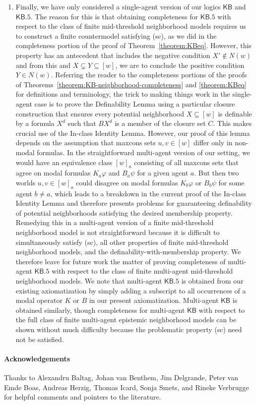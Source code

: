 \documentclass[12pt]{article}
\theoremstyle{definition}
\newcommand{\KB}{{\mathsf{KB}}}                 %
\newcommand{\KBeq}{{\mathsf{KB.5}}}             %
\begin{document}
\begin{enumerate}
\item Finally, we have only considered a single-agent version of our
  logics $\KB$ and $\KBeq$.  The reason for this is that obtaining
  completeness for $\KBeq$ with respect to the class of finite
  mid-threshold neighborhood models requires us to construct a finite
  countermodel satisfying (sc), as we did in the completeness portion
  of the proof of Theorem~\ref{theorem:KBeq}.  However, this property
  has an antecedent that includes the negative condition
  $X'\notin N(w)$ and from this and $X\subsetneq Y\subseteq[w]$, we
  are to conclude the positive condition $Y\in N(w)$.  Referring the
  reader to the completeness portions of the proofs of
  Theorems~\ref{theorem:KB-neighborhood-completeness} and
  \ref{theorem:KBeq} for definitions and terminology, the trick to
  making things work in the single-agent case is to prove the
  Definability Lemma using a particular closure construction that
  ensures every potential neighborhood $X\subseteq[w]$ is definable by
  a formula $X^d$ such that $BX^d$ is a member of the closure set $C$.
  This makes crucial use of the In-class Identity Lemma.  However, our
  proof of this lemma depends on the assumption that maxcons sets
  $u,v\in[w]$ differ only in non-modal formulas.  In the
  straightforward multi-agent version of our setting, we would have an
  equivalence class $[w]_a$ consisting of all maxcons sets that agree
  on modal formulas $K_a\varphi$ and $B_a\psi$ for a given agent $a$.
  But then two worlds $u,v\in[w]_a$ could disagree on modal formulas
  $K_b\varphi$ or $B_b\psi$ for some agent $b\neq a$, which leads to a
  breakdown in the current proof of the In-class Identity Lemma and
  therefore presents problems for guaranteeing definability of
  potential neighborhoods satisfying the desired membership property.
  Remedying this in a multi-agent version of a finite mid-threshold
  neighborhood model is not straightforward because it is difficult to
  simultaneously satisfy (sc), all other properties of finite
  mid-threshold neighborhood models, and the
  definability-with-membership property. We therefore leave for future
  work the matter of proving completeness of multi-agent $\KBeq$ with
  respect to the class of finite multi-agent mid-threshold
  neighborhood models.  We note that multi-agent $\KBeq$ is obtained
  from our existing axiomatization by simply adding a subscript to all
  occurrences of a modal operator $K$ or $B$ in our present
  axiomatization. Multi-agent $\KB$ is obtained similarly, though
  completeness for multi-agent $\KB$ with respect to the full class of
  finite multi-agent epistemic neighborhood models can be shown
  without much difficulty because the problematic property (sc) need
  not be satisfied.
\end{enumerate}

\paragraph{Acknowledgements} 

Thanks to Alexandru Baltag, Johan van Benthem, Jim Delgrande, Peter
van Emde Boas, Andreas Herzig, Thomas Icard, Sonja Smets, and Rineke
Verbrugge for helpful comments and pointers to the literature.


  
\end{document}
